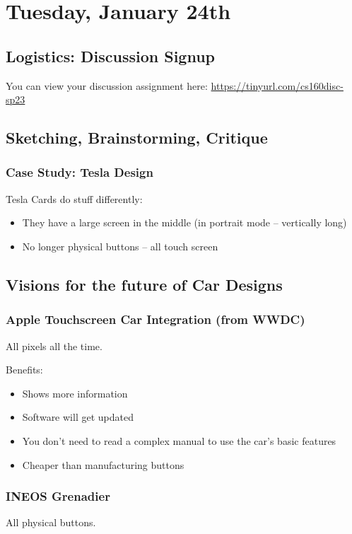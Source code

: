\section{Tuesday, January 24th}
\subsection{Logistics: Discussion Signup}
You can view your discussion assignment here: \href{https://tinyurl.com/cs160disc-sp23}{https://tinyurl.com/cs160disc-sp23}

\subsection{Sketching, Brainstorming, Critique}
\subsubsection{Case Study: Tesla Design}
Tesla Cards do stuff differently:
\begin{itemize}
    \item They have a large screen in the middle (in portrait mode -- vertically long)
    \item No longer physical buttons -- all touch screen
\end{itemize}

\subsection{Visions for the future of Car Designs}
\subsubsection{Apple Touchscreen Car Integration (from WWDC)}
All pixels all the time.

Benefits:
\begin{itemize}
    \item Shows more information
    \item Software will get updated
    \item You don't need to read a complex manual to use the car's basic features
    \item Cheaper than manufacturing buttons
\end{itemize}

\subsubsection{INEOS Grenadier}
All physical buttons.

